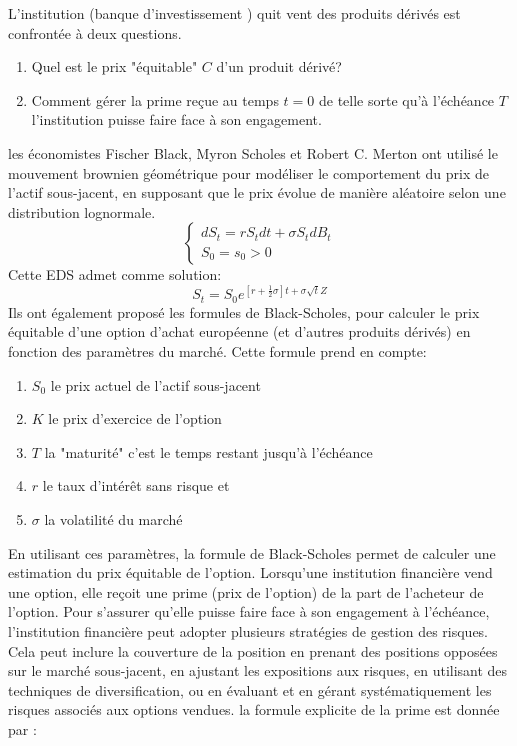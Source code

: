 \documentclass[A4paper,12pt]{report}
\begin{document}
L'institution (banque d'investissement ) quit vent des produits dérivés est confrontée à deux questions.
\begin{enumerate}

\item Quel est le prix "équitable" $C$ d'un produit dérivé?

\item Comment gérer la prime reçue au temps $t=0$ de telle sorte qu'à l'échéance $T$ l'institution puisse faire face à son engagement.
\end{enumerate} 
les économistes Fischer Black, Myron Scholes et Robert C. Merton ont utilisé le mouvement brownien géométrique pour modéliser le comportement du prix de l'actif sous-jacent, en supposant que le prix évolue de manière aléatoire selon une distribution lognormale.
$$
\left\{\begin{array}{l}
d S_{t}=r S_{t} d t+\sigma S_{t} d B_{t} \\
S_{0}=s_{0}>0
\end{array}\right.
$$
Cette EDS admet comme solution: $$S_t = S_0 e^{[r +\frac{1}{2}\sigma]t+\sigma \sqrt{t}Z}$$
Ils ont également proposé les formules de Black-Scholes, pour calculer le prix équitable d'une option d'achat européenne (et d'autres produits dérivés) en fonction des paramètres du marché. Cette formule prend en compte:
\begin{enumerate}
\item $S_0$ le prix actuel de l'actif sous-jacent
\item $K$ le prix d'exercice de l'option
\item $T$ la "maturité" c'est le temps restant jusqu'à l'échéance
\item $r$ le taux d'intérêt sans risque et 
\item $\sigma$ la volatilité du marché
\end{enumerate}
En utilisant ces paramètres, la formule de Black-Scholes permet de calculer une estimation du prix équitable de l'option.
Lorsqu'une institution financière vend une option, elle reçoit une prime (prix de l'option) de la part de l'acheteur de l'option. Pour s'assurer qu'elle puisse faire face à son engagement à l'échéance, l'institution financière peut adopter plusieurs stratégies de gestion des risques. Cela peut inclure la couverture de la position en prenant des positions opposées sur le marché sous-jacent, en ajustant les expositions aux risques, en utilisant des techniques de diversification, ou en évaluant et en gérant systématiquement les risques associés aux options vendues.
la formule explicite de la prime est donnée par :
\end{document}
